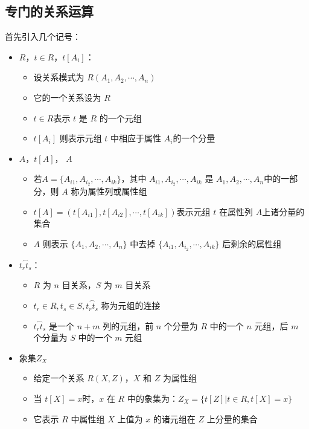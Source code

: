 \subsection{专门的关系运算}
首先引入几个记号：
\begin{itemize}
    \item $R$，$t\in R$，$t[A_i]$：
    \begin{itemize}
        \item 设关系模式为 $R(A_1,A_2,\cdots, A_n)$
        \item 它的一个关系设为 $R$
        \item $t \in R$表示 $t$ 是 $R$ 的一个元组
        \item $t[A_i]$ 则表示元组 $t$ 中相应于属性 $A_i$的一个分量
    \end{itemize}
    \item $A$，$t[A]$， $A$
    \begin{itemize}
        \item 若$A=\{A_{i1},A_{i_2},\cdots ,A_{ik}\}$，其中 $A_{i1},A_{i_2},\cdots ,A_{ik}$ 是 $A_1,A_2,\cdots, A_n$中的一部分，则 $A$ 称为属性列或属性组
        \item $t[A]=(t[A_{i1}],t[A_{i2}],\cdots ,t[A_{ik}])$表示元组 $t$ 在属性列 $A$上诸分量的集合
        \item $A$ 则表示 $\{A_1,A_2,\cdots, A_n\}$ 中去掉 $\{A_{i1},A_{i_2},\cdots ,A_{ik}\}$ 后剩余的属性组
    \end{itemize}
    \item $\overset{\frown}{t_rt_s}$：
    \begin{itemize}
        \item $R$ 为 $n$ 目关系，$S$ 为 $m$ 目关系
        \item $t_r\in R, t_s \in S,\overset{\frown}{t_rt_s}$ 称为元组的连接
        \item $\overset{\frown}{t_rt_s}$ 是一个 $n + m$ 列的元组，前 $n$ 个分量为 $R$ 中的一个 $n$ 元组，后 $m$ 个分量为 $S$ 中的一个 $m$ 元组
    \end{itemize}
    \item 象集$Z_X$
    \begin{itemize}
        \item 给定一个关系 $R(X,Z)$，$X$ 和 $Z$ 为属性组
        \item 当 $t[X] = x$时，$x$ 在 $R$ 中的象集为：$Z_X = \{t[Z] | t\in R ,t[X] = x\}$
        \item 它表示 $R$ 中属性组 $X$ 上值为 $x$ 的诸元组在 $Z$ 上分量的集合 
    \end{itemize}
\end{itemize}

